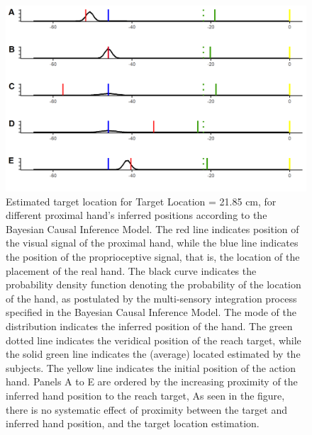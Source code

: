 \begin{figure}[t]
\centering       
    \includegraphics[width=\textwidth, keepaspectratio]{Images/bci_plot2.png}
    \caption{Estimated target location for Target Location = 21.85 cm, for different proximal hand's inferred positions according to the Bayesian Causal Inference Model. The red line indicates position of the visual signal of the proximal hand, while the blue line indicates the position of the proprioceptive signal, that is, the location of the placement of the real hand. The black curve indicates the probability density function denoting the probability of the location of the hand, as postulated by the multi-sensory integration process specified in the Bayesian Causal Inference Model. The mode of the distribution indicates the inferred position of the hand. The green dotted line indicates the veridical position of the reach target, while the solid green line indicates the (average) located estimated by the subjects. The yellow line indicates the initial position of the action hand. Panels A to E are ordered by the increasing proximity of the inferred hand position to the reach target, As seen in the figure, there is no systematic effect of proximity between the target and inferred hand position, and the target location estimation. }
    \label{fig:bci-plot2}
\end{figure}